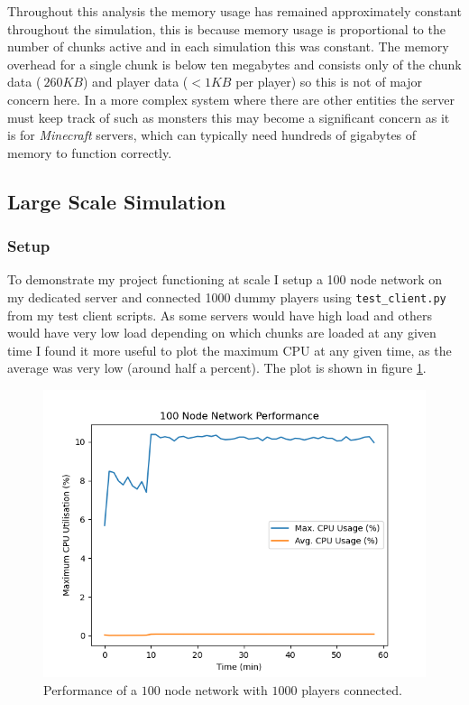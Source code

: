 \documentclass[12pt,notitlepage,a4paper]{report}
\begin{document}
	Throughout this analysis the memory usage has remained approximately constant throughout the simulation, this is because memory usage is proportional to the number of chunks active and in each simulation this was constant. The memory overhead for a single chunk is below ten megabytes and consists only of the chunk data ($~260KB$) and player data ($<1KB$ per player) so this is not of major concern here. In a more complex system where there are other entities the server must keep track of such as monsters this may become a significant concern as it is for \emph{Minecraft} servers, which can typically need hundreds of gigabytes of memory to function correctly.
	
	\subsection{Large Scale Simulation}
	\subsubsection{Setup}
	To demonstrate my project functioning at scale I setup a 100 node network on my dedicated server and connected 1000 dummy players using {\tt test\_client.py} from my test client scripts. As some servers would have high load and others would have very low load depending on which chunks are loaded at any given time I found it more useful to plot the maximum CPU at any given time, as the average was very low (around half a percent). The plot is shown in figure \ref{fig:big}.
	\begin{figure}
		\includegraphics[width=\textwidth]{100node.png}
		\caption{Performance of a $100$ node network with $1000$ players connected.}
		\label{fig:big}
	\end{figure}
\end{document}
